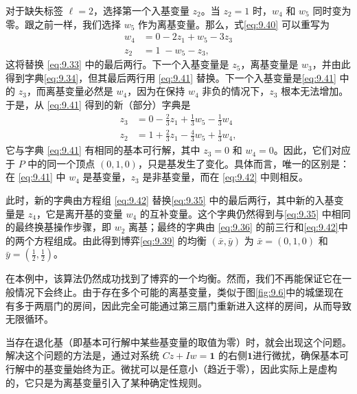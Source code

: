 对于缺失标签 \(\ell  = 2\)，选择第一个入基变量 \({z}_{2}\)。当 \({z}_{2} = 1\) 时，\({w}_{4}\) 和 \({w}_{5}\) 同时变为零。跟之前一样，我们选择 \({w}_{5}\) 作为离基变量。那么，式\eqref{eq:9.40} 可以重写为
\begin{equation}
\label{eq:9.41}
\begin{aligned}
{w}_{4} & = 0 - 2{z}_{1} + {w}_{5} - 3{z}_{3} \\
{z}_{2} & = 1\; - {w}_{5} - {z}_{3},
\end{aligned}
\end{equation}
这将替换 \eqref{eq:9.33} 中的最后两行。下一个入基变量是 \({z}_{5}\)，离基变量是 \({w}_{3}\)，并由此得到字典\eqref{eq:9.34}，但其最后两行用 \eqref{eq:9.41} 替换。下一个入基变量是\eqref{eq:9.41} 中的 \({z}_{3}\)，而离基变量必然是 \({w}_{4}\)，因为在保持 \({w}_{4}\) 非负的情况下，\({z}_{3}\) 根本无法增加。于是，从 \eqref{eq:9.41} 得到的新（部分）字典是
\begin{equation}
\label{eq:9.42}
\begin{aligned}
{z}_{3} & = 0 - \frac{2}{3}{z}_{1} + \frac{1}{3}{w}_{5} - \frac{1}{3}{w}_{4} \\
{z}_{2} & = 1 + \frac{2}{3}{z}_{1} - \frac{4}{3}{w}_{5} + \frac{1}{3}{w}_{4},
\end{aligned}
\end{equation}
它与字典 \eqref{eq:9.41} 有相同的基本可行解，其中 \({z}_{3} = 0\) 和 \({w}_{4} = 0\)。因此，它们对应于 \(P\) 中的同一个顶点 $(0, 1, 0)$，只是基发生了变化。具体而言，唯一的区别是：在 \eqref{eq:9.41} 中 \({w}_{4}\) 是基变量，\({z}_{3}\) 是非基变量，而在 \eqref{eq:9.42} 中则相反。

此时，新的字典由方程组 \eqref{eq:9.42} 替换\eqref{eq:9.35} 中的最后两行，其中新的入基变量是 \({z}_{4}\)，它是离开基的变量 \(w_{4}\) 的互补变量。这个字典仍然得到与\eqref{eq:9.35} 中相同的最终换基操作步骤，即 \({w}_{2}\) 离基；最终的字典由 \eqref{eq:9.36} 的前三行和\eqref{eq:9.42}中的两个方程组成。由此得到博弈\eqref{eq:9.39} 的均衡 \(\left( {\bar{x},\bar{y}}\right)\) 为 \(\bar{x} = \left( {0,1,0}\right)\) 和 \(\bar{y} = \left( {\frac{1}{2},\frac{1}{2}}\right)\)。

在本例中，该算法仍然成功找到了博弈的一个均衡。然而，我们不再能保证它在一般情况下会终止。由于存在多个可能的离基变量，类似于图\ref{fig:9.6}中的城堡现在有多于两扇门的房间，因此完全可能通过第三扇门重新进入这样的房间，从而导致无限循环。


当存在退化基（即基本可行解中某些基变量的取值为零）时，就会出现这个问题。解决这个问题的方法是，通过对系统 \({Cz} + {Iw} = \mathbf{1}\) 的右侧$\mathbf{1}$进行微扰，确保基本可行解中的基变量始终为正。微扰可以是任意小（趋近于零），因此实际上是虚构的，它只是为离基变量引入了某种确定性规则。

